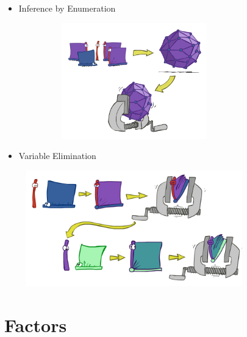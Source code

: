 \documentclass[11pt,a4paper]{report}
\begin{document}
\begin{itemize}
    \item Inference by Enumeration
    
    \includegraphics[width = 10cm, height = 5cm]{enumeration_slow.png}

    \item Variable Elimination
    
    \includegraphics[width = 10cm, height = 5cm]{variable_elimination.png}

\end{itemize}

\section{Factors}
\end{document}
